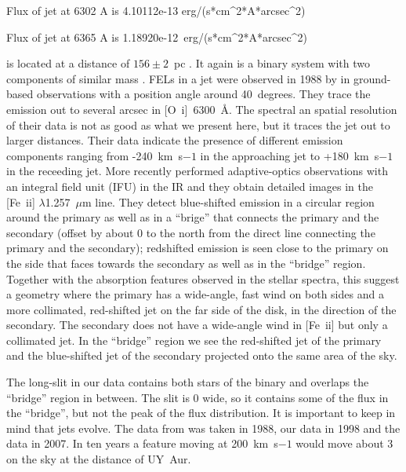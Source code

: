 \documentclass[twocolumn]{aastex62}
\begin{document}
Flux of jet at 6302 A is 4.10112e-13 erg/(s*cm\^{}2*A*arcsec\^{}2) ~

Flux of jet at 6365 A is 1.18920e-12~erg/(s*cm\^{}2*A*arcsec\^{}2) ~

 is  located at a distance of $156\pm2$~pc \citep{2016A&A...595A...1G,2018A&A...616A...1G}. It again is a binary system with two components of similar mass \citep[M0 and M2][]{2003ApJ...583..334H}. FELs in a jet were observed in 1988 by \citet{1997A&AS..126..437H} in ground-based observations with a position angle around 40~degrees. They trace the emission out to several arcsec in [O~{\sc i}]~6300~\AA{}. The spectral an spatial resolution of their data is not as good as what we present here, but it traces the jet out to larger distances. Their data indicate the presence of different emission components ranging from -240~km~s${-1}$ in the approaching jet to +180~km~s${-1}$ in the receeding jet. More recently \citet{2014ApJ...786...63P} performed adaptive-optics observations with an integral field unit (IFU) in the IR and they obtain detailed images in the [Fe~{\sc ii}] $\lambda$1.257~$\mu$m line. They detect blue-shifted emission in a circular region around the primary as well as in a ``brige'' that connects the primary and the secondary (offset by about 0 to the north from the direct line connecting the primary and the secondary); redshifted emission is seen close to the primary on the side that faces towards the secondary as well as in the ``bridge'' region. Together with the absorption features observed in the stellar spectra, this suggest a geometry where the primary has a wide-angle, fast wind on both sides and a more collimated, red-shifted jet on the far side of the disk, in the direction of the secondary. The secondary does not have a wide-angle wind in [Fe~{\sc ii}] but only a collimated jet. In the ``bridge'' region we see the red-shifted jet of the primary and the blue-shifted jet of the secondary projected onto the same area of the sky.

The long-slit in our data contains both stars of the binary and overlaps the ``bridge'' region in between. The slit is 0 wide, so it contains some of the flux in the ``bridge'', but not the peak of the flux distribution. It is important to keep in mind that jets evolve. The data from \citet{1997A&AS..126..437H} was taken in 1988, our data in 1998 and the \citet{2014ApJ...786...63P} data in 2007. In ten years a feature moving at 200~km~s${-1}$ would move about 3\arcsec{} on the sky at the distance of UY~Aur. 
\end{document}
